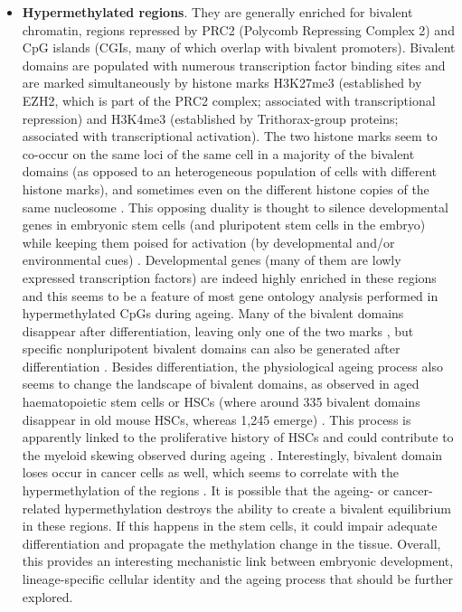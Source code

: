 \begin{itemize}
	
	\item \textbf{Hypermethylated regions}. They are generally enriched for bivalent chromatin, regions repressed by \acrshort{PRC2} (Polycomb Repressing Complex 2) and CpG islands (\acrshort{CGI}s, many of which overlap with bivalent promoters). Bivalent domains are populated with numerous transcription factor binding sites and are marked simultaneously by histone marks H3K27me3 (established by EZH2, which is part of the PRC2 complex; associated with transcriptional repression) and H3K4me3 (established by Trithorax-group proteins; associated with transcriptional activation). The two histone marks seem to co-occur on the same loci of the same cell in a majority of the bivalent domains (as opposed to an heterogeneous population of cells with different histone marks), and sometimes even on the different histone copies of the same nucleosome \cite{Voigt2013}. This opposing duality is thought to silence developmental genes in embryonic stem cells (and pluripotent stem cells in the embryo) while keeping them poised for activation (by developmental and/or environmental cues) \cite{Voigt2013}. Developmental genes (many of them are lowly expressed transcription factors) are indeed highly enriched in these regions and this seems to be a feature of most gene ontology analysis performed in hypermethylated CpGs during ageing. Many of the bivalent domains disappear after differentiation, leaving only one of the two marks \cite{Bernstein2006}, but specific nonpluripotent bivalent domains can also be generated after differentiation \cite{Voigt2013}. Besides differentiation, the physiological ageing process also seems to change the landscape of bivalent domains, as observed in aged haematopoietic stem cells or \acrshort{HSCs} (where around 335 bivalent domains disappear in old mouse HSCs, whereas 1,245 emerge) \cite{Sun2014x}. This process is apparently linked to the proliferative history of \acrshort{HSCs} \cite{Beerman2013} and could contribute to the myeloid skewing observed during ageing \cite{Sun2014x,Beerman2013}. Interestingly, bivalent domain loses occur in cancer cells as well, which seems to correlate with the hypermethylation of the regions \cite{Bernhart2016}. It is possible that the ageing- or cancer-related hypermethylation destroys the ability to create a bivalent equilibrium in these regions. If this happens in the stem cells, it could impair adequate differentiation and propagate the methylation change in the tissue. Overall, this provides an interesting mechanistic link between embryonic development, lineage-specific cellular identity and the ageing process that should be further explored.   
	

\end{itemize}
